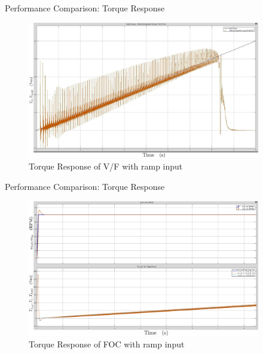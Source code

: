 \begin{frame}{Performance Comparison: Torque Response}
	\begin{figure}
		\includegraphics[width=4in]{conference/60rpmTorque.jpeg} %
		\caption{Torque Response of V/F with ramp input}
	\end{figure}
\end{frame}

\begin{frame}{Performance Comparison: Torque Response}
	\begin{figure}
		\includegraphics[width=4in]{conference/foc_60rpm.png} %
		\caption{Torque Response of FOC with ramp input}
	\end{figure}
\end{frame}


